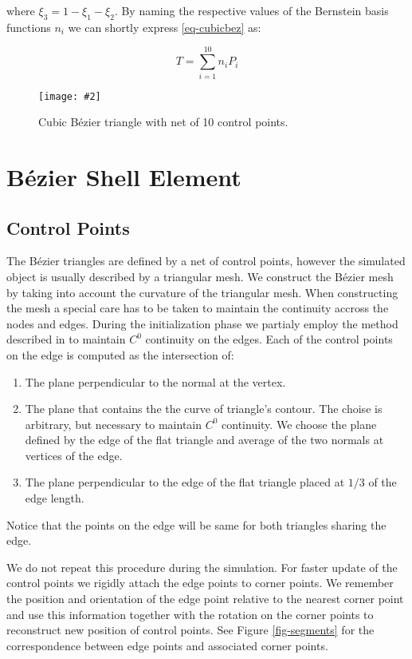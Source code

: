 \documentclass{egpubl}
\newcommand{\Figure}[3]{%
\begin{figure}[htb]
  \centering
  \texttt{[image: \#2]}
  \caption{\label{fig-#2}#3}
\end{figure}}
\begin{document}
where $ \xi_3 = 1 - \xi_1 - \xi_2 $. By naming the respective values of
the Bernstein basis functions $n_i$ we can shortly express
\eqref{eq-cubicbez} as:

\begin{equation}\label{eq-cubicbez2}
    T = \sum_{i=1}^{10} n_i P_i
\end{equation}

\Figure{0.8\linewidth}{bezier}
{Cubic Bézier triangle with net of 10 control points.}


\section{Bézier Shell Element} %

\subsection{Control Points} %

The Bézier triangles are defined by a net of control points, however the
simulated object is usually described by a triangular mesh. We construct
the Bézier mesh by taking into account the curvature of the triangular
mesh. When constructing the mesh a special care has to be taken to maintain
the continuity accross the nodes and edges. During the initialization phase
we partialy employ the method described in \cite{Ubach2010} to maintain
$C^0$ continuity on the edges. Each of the control points on the edge is
computed as the intersection of:

\begin{enumerate}
    \item The plane perpendicular to the normal at the vertex.
    \item The plane that contains the the curve of triangle's contour. The
        choise is arbitrary, but necessary to maintain $C^0$ continuity. 
        We choose the plane defined by the edge of the flat triangle and
        average of the two normals at vertices of the edge. 
    \item The plane perpendicular to the edge of the flat triangle placed at
        $1/3$ of the edge length.
\end{enumerate}

Notice that the points on the edge will be same for both triangles sharing
the edge.

We do not repeat this procedure during the simulation. For faster update of
the control points we rigidly attach the edge points to corner points. We
remember the position and orientation of the edge point relative to the
nearest corner point and use this information together with the rotation on
the corner points to reconstruct new position of control points. See Figure
\ref{fig-segments} for the correspondence between edge points and
associated corner points.
\end{document}
